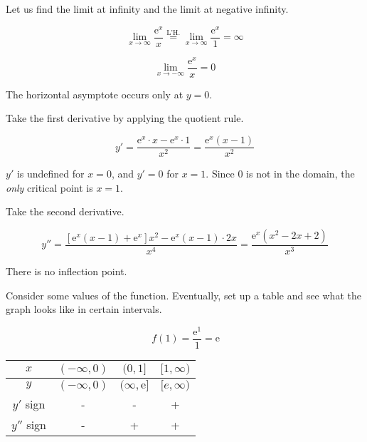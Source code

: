 \documentclass{article}
\begin{document}
\hfill

\noindent Let us find the limit at infinity and the limit at negative infinity.

\begin{equation*}\lim_{x\to \infty} \frac{\mathrm{e}^x}{x} \overset{\text{L'H.}}{=} \lim_{x\to \infty} \frac{\mathrm{e}^x}{1} = \infty\end{equation*}

\begin{equation*}\lim_{x\to -\infty} \frac{\mathrm{e}^x}{x} = 0\end{equation*}

\hfill

\noindent The horizontal asymptote occurs only at $y=0$.

\hfill

\noindent Take the first derivative by applying the quotient rule.

\begin{equation*}y' = \frac{\mathrm{e}^x\cdot x - \mathrm{e}^x\cdot 1}{x^2}=\frac{\mathrm{e}^x(x-1)}{x^2}\end{equation*}

\hfill

\noindent $y'$ is undefined for $x=0$, and $y'=0$ for $x=1$. Since 0 is not in the domain, the \textit{only} critical point is $x = 1$.

\hfill

\noindent Take the second derivative.

\begin{equation*}y'' = \frac{[\mathrm{e}^x(x-1) + \mathrm{e}^x]x^2 - \mathrm{e}^x(x-1) \cdot 2x }{x^4}=\frac{\mathrm{e}^x(x^2-2x + 2)}{x^3}\end{equation*}

\hfill

\noindent There is no inflection point.

\hfill

\noindent Consider some values of the function. Eventually, set up a table and see what the graph looks like in certain intervals.

\begin{equation*}\,f(1) = \frac{\mathrm{e}^1}{1} = \mathrm{e}\end{equation*}

\begin{center}
    \large
    \begin{tabular}{ |c| c c c| } 
    \hline
        $x$ & $(-\infty, 0)$ & $(0, 1]$ & $[1, \infty)$  \\
        \hline
        $y$ & $(-\infty, 0)$ & $(\infty, \mathrm{e}]$ & $[e, \infty)$\\
        \hline
        $y'$ sign & - & - & + \\
        \hline
        $y''$ sign & - & + & + \\
        \hline
    \end{tabular}
\end{center}
\end{document}

